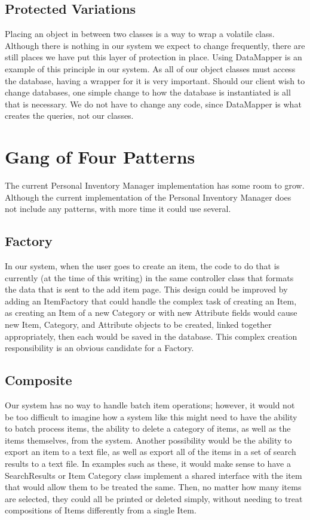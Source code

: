 \documentclass{article}
\begin{document}
\subsection{Protected Variations}
Placing an object in between two classes is a way to wrap a volatile class. Although there is nothing in our system we expect to change frequently, there are still places we have put this layer of protection in place. Using DataMapper is an example of this principle in our system. As all of our object classes must access the database, having a wrapper for it is very important. Should our client wish to change databases, one simple change to how the database is instantiated is all that is necessary. We do not have to change any code, since DataMapper is what creates the queries, not our classes.\\

\section{Gang of Four Patterns}
The current Personal Inventory Manager implementation has some room to grow. Although the current implementation of the Personal Inventory Manager does not include any patterns, with more time it could use several. \\
\subsection{Factory}
In our system, when the user goes to create an item, the code to do that is currently (at the time of this writing) in the same controller class that formats the data that is sent to the add item page. This design could be improved by adding an ItemFactory that could handle the complex task of creating an Item, as creating an Item of a new Category or with new Attribute fields would cause new Item, Category, and Attribute objects to be created, linked together appropriately, then each would be saved in the database. This complex creation responsibility is an obvious candidate for a Factory. \\
\subsection{Composite}
Our system has no way to handle batch item operations; however, it would not be too difficult to imagine how a system like this might need to have the ability to batch process items, the ability to delete a category of items, as well as the items themselves, from the system. Another possibility would be the ability to export an item to a text file, as well as export all of the items in a set of search results to a text file. In examples such as these, it would make sense to have a SearchResults or Item Category class implement a shared interface with the item that would allow them to be treated the same. Then, no matter how many items are selected, they could all be printed or deleted simply, without needing to treat compositions of Items differently from a single Item.\\
\end{document}

